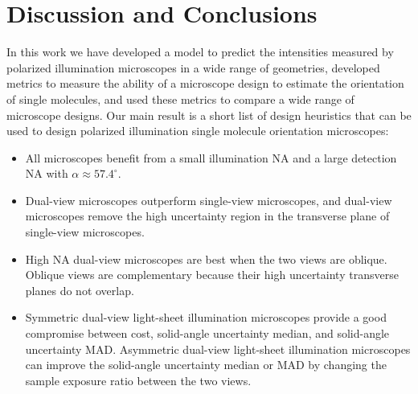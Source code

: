 \documentclass[10pt]{article}
\begin{document}
\section{Discussion and Conclusions}\label{discussion}


In this work we have developed a model to predict the intensities measured by
polarized illumination microscopes in a wide range of geometries, developed
metrics to measure the ability of a microscope design to estimate the
orientation of single molecules, and used these metrics to compare a wide
range of microscope designs. Our main result is a short list of design
heuristics that can be used to design polarized illumination single molecule
orientation microscopes:
\begin{itemize}
\item All microscopes benefit from a small illumination NA and a large detection
  NA with $\alpha \approx 57.4^{\circ}$.
\item Dual-view microscopes outperform single-view microscopes, and dual-view
  microscopes remove the high uncertainty region in the transverse plane of
  single-view microscopes.
\item High NA dual-view microscopes are best when the two views are
  oblique. Oblique views are complementary because their high uncertainty
  transverse planes do not overlap.
\item Symmetric dual-view light-sheet illumination microscopes provide a good
  compromise between cost, solid-angle uncertainty median, and solid-angle
  uncertainty MAD. Asymmetric dual-view light-sheet illumination microscopes
  can improve the solid-angle uncertainty median or MAD by changing the sample
  exposure ratio between the two views.
\end{itemize}
\end{document}
